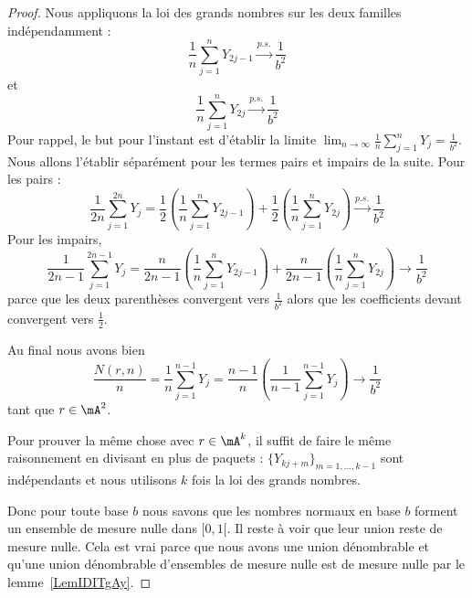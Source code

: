 \begin{proof}
	Nous appliquons la loi des grands nombres sur les deux familles indépendamment :
	\begin{equation}
		\frac{1}{ n }\sum_{j=1}^nY_{2j-1}\stackrel{p.s.}{\longrightarrow}\frac{1}{ b^2 }
	\end{equation}
	et
	\begin{equation}
		\frac{1}{ n }\sum_{j=1}^nY_{2j}\stackrel{p.s.}{\longrightarrow}\frac{1}{ b^2 }
	\end{equation}
	Pour rappel, le but pour l'instant est d'établir la limite \( \lim_{n\to \infty} \frac{1}{ n }\sum_{j=1}^nY_j=\frac{1}{ b^2 }\). Nous allons l'établir séparément pour les termes pairs et impairs de la suite. Pour les pairs :
	\begin{equation}
		\frac{1}{ 2n }\sum_{j=1}^{2n}Y_j=\frac{ 1 }{2}\left( \frac{1}{ n }\sum_{j=1}^nY_{2j-1} \right)+\frac{ 1 }{2}\left( \frac{1}{ n }\sum_{j=1}^nY_{2j} \right)\stackrel{p.s.}{\longrightarrow}\frac{1}{ b^2 }
	\end{equation}
	Pour les impairs,
	\begin{equation}
		\frac{1}{ 2n-1 }\sum_{j=1}^{2n-1}Y_j=\frac{ n }{ 2n-1 }\left( \frac{1}{ n }\sum_{j=1}^nY_{2j-1} \right)+\frac{ n }{ 2n-1 }\left( \frac{1}{ n }\sum_{j=1}^nY_{2j} \right)\to\frac{1}{ b^2 }
	\end{equation}
	parce que les deux parenthèses convergent vers \( \frac{1}{ b^2 }\) alors que les coefficients devant convergent vers \( \frac{ 1 }{2}\).

	Au final nous avons bien
	\begin{equation}
		\frac{ N(r,n) }{ n }=\frac{1}{ n }\sum_{j=1}^{n-1}Y_j=\frac{ n-1 }{ n }\left( \frac{1}{ n-1 }\sum_{j=1}^{n-1}Y_j \right)\to\frac{1}{ b^2 }
	\end{equation}
	tant que \( r\in\mA^2\).

	Pour prouver la même chose avec \( r\in \mA^k\), il suffit de faire le même raisonnement en divisant en plus de paquets : \( \{ Y_{kj+m} \}_{m=1,\ldots, k-1}\) sont indépendants et nous utilisons \( k\) fois la loi des grands nombres.

	Donc pour toute base \( b\) nous savons que les nombres normaux en base \( b\) forment un ensemble de mesure nulle dans \( \mathopen[ 0 , 1 [\). Il reste à voir que leur union reste de mesure nulle. Cela est vrai parce que nous avons une union dénombrable et qu'une union dénombrable d'ensembles de mesure nulle est de mesure nulle par le lemme~\ref{LemIDITgAy}.
\end{proof}

